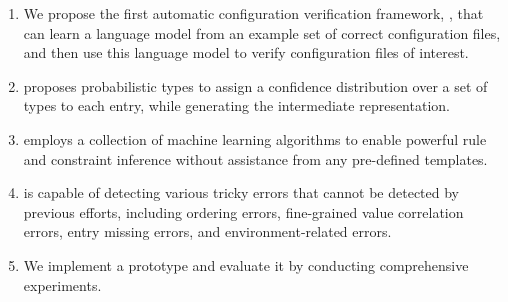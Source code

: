 \begin{enumerate}

\item We propose the first automatic configuration verification
framework, \app, that can learn a language model from an example set of 
correct configuration files, and then use this language model to verify 
configuration files of interest.
 
\item \app proposes probabilistic types to assign a confidence 
distribution over a set of types to each entry, 
while generating the intermediate representation. 

\item \app employs a collection of machine learning algorithms to 
enable powerful rule and constraint inference without assistance 
from any pre-defined templates.

\item \app is capable of detecting various tricky errors that cannot
be detected by previous efforts,
including ordering errors, fine-grained value correlation errors, 
entry missing errors, and environment-related errors. 

\item We implement a \app prototype and evaluate it by
conducting comprehensive experiments.

\end{enumerate}
